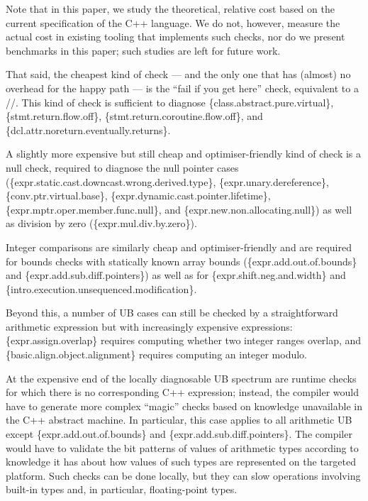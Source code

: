 {Note that in this paper, we study the theoretical, relative cost based on the current specification of the C++ language. We do not, however, measure the actual cost in existing tooling that implements such checks, nor do we present benchmarks in this paper; such studies are left for future work.

That said, the cheapest kind of check --- and the only one that has (almost) no overhead for the happy path --- is the ``fail if you get here'' check, equivalent to a //. This kind of check is sufficient to diagnose \{class.abstract.pure.virtual\}, \{stmt.return.flow.off\}, \{stmt.return.coroutine.flow.off\}, and \{dcl.attr.noreturn.eventually.returns\}.

A slightly more expensive but still cheap and optimiser-friendly kind of check is a null check, required to diagnose the null pointer cases  
(\{expr.static.cast.downcast.wrong.derived.type\},
\{expr.unary.deref\-erence\},
\{conv.ptr.virtual.base\},
\{expr.dynamic.cast.pointer.lifetime\}, 
\{expr.mptr.oper.member.\linebreak[3]func.null\}, and
\{expr.new.non.allocating.null\})
as well as division by zero (\{expr.mul.div.by.zero\}).

Integer comparisons are similarly cheap and optimiser-friendly and are   required for bounds checks with statically known array bounds
(\{expr.add.out.of.bounds\} and
\{expr.add.sub.diff.pointers\})
as well as for \{expr.shift.neg.and.width\} 
and \{intro.execution.unsequenced.modification\}.

Beyond this, a number of UB cases can still be checked by a straightforward arithmetic expression but with increasingly expensive expressions: \{expr.assign.overlap\} requires computing whether two integer ranges overlap, and  \{basic.align.object.alignment\} requires computing an integer modulo. 

At the expensive end of the locally diagnosable UB spectrum are runtime checks for which there is no corresponding C++ expression; instead, the compiler would have to generate more complex ``magic'' checks based on knowledge unavailable in the C++ abstract machine. In particular, this case applies to all arithmetic UB except \{expr.add.out.of.bounds\} and
\{expr.add.sub.diff.pointers\}. The compiler would have to validate the bit patterns of values of arithmetic types according to knowledge it has about how values of such types are represented on the targeted platform. Such checks can be done locally, but they can slow operations involving built-in types and, in particular, floating-point types.

}
